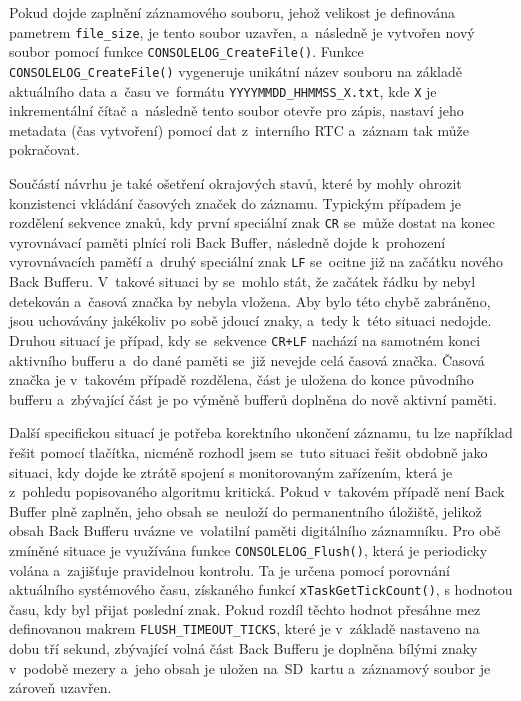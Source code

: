 Pokud dojde zaplnění záznamového souboru, jehož velikost je definována pametrem \texttt{file\_size}, je tento soubor uzavřen, a~následně je vytvořen nový soubor pomocí funkce \texttt{CONSOLELOG\_CreateFile()}. Funkce \texttt{CONSOLELOG\_CreateFile()} vygeneruje unikátní název souboru na základě aktuálního data a~času ve~formátu \texttt{YYYYMMDD\_HHMMSS\_X.txt}, kde \texttt{X} je inkrementální čítač a~následně tento soubor otevře pro zápis, nastaví jeho metadata (čas vytvoření) pomocí dat z~interního RTC a~záznam tak může pokračovat.

Součástí návrhu je také ošetření okrajových stavů, které by mohly ohrozit konzistenci vkládání časových značek do záznamu. Typickým případem je rozdělení sekvence znaků, kdy první speciální znak \texttt{CR} se~může dostat na konec vyrovnávací paměti plnící roli Back Buffer, následně dojde k~prohození vyrovnávacích paměťí a~druhý speciální znak \texttt{LF} se~ocitne již na začátku nového Back Bufferu. V~takové situaci by se~mohlo stát, že začátek řádku by nebyl detekován a~časová značka by nebyla vložena. Aby bylo této chybě zabráněno, jsou uchovávány jakékoliv po sobě jdoucí znaky, a~tedy k~této situaci nedojde. Druhou situací je případ, kdy se~sekvence \texttt{CR+LF} nachází na samotném konci aktivního bufferu a~do dané paměti se~již nevejde celá časová značka. Časová značka je v~takovém případě rozdělena, část je uložena do konce původního bufferu a~zbývající část je po výměně bufferů doplněna do nově aktivní paměti.

\newpage

Další specifickou situací je potřeba korektního ukončení záznamu, tu lze například řešit pomocí tlačítka, nicméně rozhodl jsem se~tuto situaci řešit obdobně jako situaci, kdy dojde ke ztrátě spojení s monitorovaným zařízením, která je z~pohledu popisovaného algoritmu kritická. Pokud v~takovém případě není Back Buffer plně zaplněn, jeho obsah se~neuloží do permanentního úložiště,  jelikož obsah Back Bufferu uvázne ve~volatilní paměti digitálního záznamníku. Pro obě zmíněné situace je využívána funkce \texttt{CONSOLELOG\_Flush()}, která je periodicky volána a~zajišťuje pravidelnou kontrolu. Ta je určena pomocí porovnání aktuálního systémového času, získaného funkcí \texttt{xTaskGetTickCount()}, s hodnotou času, kdy byl přijat poslední znak. Pokud rozdíl těchto hodnot přesáhne mez definovanou makrem \texttt{FLUSH\_TIMEOUT\_TICKS}, které je v~základě nastaveno na dobu tří sekund, zbývající volná část Back Bufferu je doplněna bílými znaky v~podobě mezery a~jeho obsah je uložen na~SD~kartu a~záznamový soubor je zároveň uzavřen.

